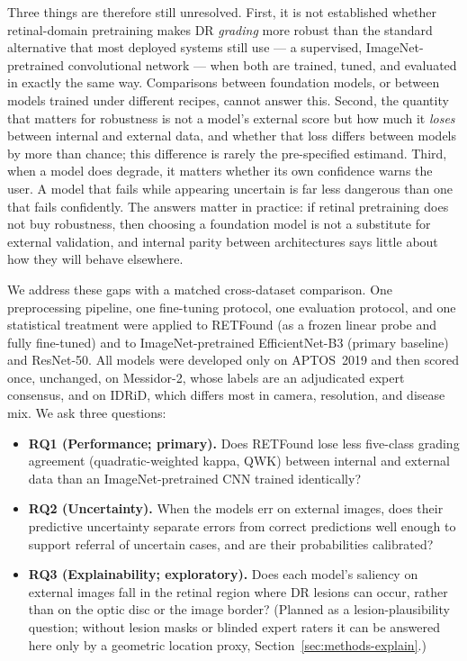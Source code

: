 \documentclass[journal]{IEEEtran}
\renewcommand{\_}{\origunderscore\allowbreak}
\begin{document}
Three things are therefore still unresolved. First, it is not established
whether retinal-domain pretraining makes DR \emph{grading} more robust than the
standard alternative that most deployed systems still use --- a supervised,
ImageNet-pretrained convolutional network --- when both are trained, tuned, and
evaluated in exactly the same way. Comparisons between foundation models, or
between models trained under different recipes, cannot answer this. Second, the
quantity that matters for robustness is not a model's external score but how much
it \emph{loses} between internal and external data, and whether that loss
differs between models by more than chance; this difference is rarely the
pre-specified estimand. Third, when a model does degrade, it matters whether its
own confidence warns the user. A model that fails while appearing uncertain is
far less dangerous than one that fails confidently. The answers matter in
practice: if retinal pretraining does not buy robustness, then choosing a
foundation model is not a substitute for external validation, and internal
parity between architectures says little about how they will behave elsewhere.

We address these gaps with a matched cross-dataset comparison. One preprocessing
pipeline, one fine-tuning protocol, one evaluation protocol, and one statistical
treatment were applied to RETFound (as a frozen linear probe and fully
fine-tuned) and to ImageNet-pretrained EfficientNet-B3 (primary baseline) and
ResNet-50. All models were developed only on APTOS~2019 and then scored once,
unchanged, on Messidor-2, whose labels are an adjudicated expert consensus, and
on IDRiD, which differs most in camera, resolution, and disease mix. We ask three
questions:
\begin{itemize}
  \item \textbf{RQ1 (Performance; primary).} Does RETFound lose less five-class
    grading agreement (quadratic-weighted kappa, QWK) between internal and
    external data than an ImageNet-pretrained CNN trained identically?
  \item \textbf{RQ2 (Uncertainty).} When the models err on external images, does
    their predictive uncertainty separate errors from correct predictions well
    enough to support referral of uncertain cases, and are their probabilities
    calibrated?
  \item \textbf{RQ3 (Explainability; exploratory).} Does each model's saliency
    on external images fall in the retinal region where DR lesions can occur,
    rather than on the optic disc or the image border? (Planned as a
    lesion-plausibility question; without lesion masks or blinded expert raters
    it can be answered here only by a geometric location proxy,
    Section~\ref{sec:methods-explain}.)
\end{itemize}
\end{document}
